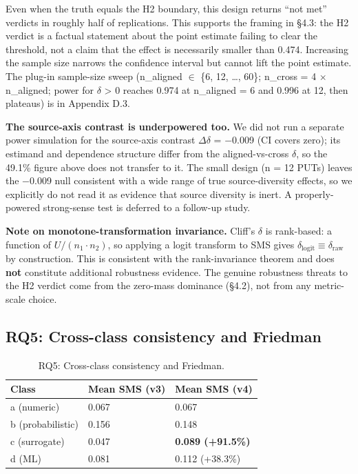 \documentclass[manuscript,screen,review]{acmart}
\begin{document}
Even when the truth equals the H2 boundary, this design returns ``not
met'' verdicts in roughly half of replications. This supports the
framing in §4.3: the H2 verdict is a factual statement about the point
estimate failing to clear the threshold, not a claim that the effect is
necessarily smaller than 0.474. Increasing the sample size narrows the
confidence interval but cannot lift the point estimate. The plug-in
sample-size sweep (n\_aligned $\in$ \{6, 12, \ldots, 60\}; n\_cross = 4 $\times$
n\_aligned; power for $\delta$ \textgreater{} 0 reaches 0.974 at n\_aligned = 6
and 0.996 at 12, then plateaus) is in Appendix D.3.

\textbf{The source-axis contrast is underpowered too.} We did not run a
separate power simulation for the source-axis contrast $\Delta\delta$ =
$-$0.009 (CI covers zero); its estimand and dependence structure differ
from the aligned-vs-cross $\delta$, so the 49.1\% figure above does not
transfer to it. The small design (n = 12 PUTs) leaves the $-$0.009 null
consistent with a wide range of true source-diversity effects, so we
explicitly do not read it as evidence that source diversity is inert. A
properly-powered strong-sense test is deferred to a follow-up study.

\textbf{Note on monotone-transformation invariance.} Cliff's $\delta$ is
rank-based: a function of $U / (n_1 \cdot n_2)$, so applying a logit transform to
SMS gives $\delta_{\mathrm{logit}} \equiv \delta_{\mathrm{raw}}$ by construction. This is consistent with the
rank-invariance theorem and does \textbf{not} constitute additional
robustness evidence. The genuine robustness threats to the H2 verdict
come from the zero-mass dominance (§4.2), not from any metric-scale
choice.

\subsection{RQ5: Cross-class consistency and Friedman}\label{rq3-cross-class-consistency-and-friedman}

{%
\begin{longtable}[]{@{}lll@{}}
\caption{RQ5: Cross-class consistency and Friedman.}\label{tab:p2-12}\\
\toprule\noalign{}
Class & Mean SMS (v3) & Mean SMS (v4) \\
\midrule\noalign{}
\endfirsthead
\endhead
\bottomrule\noalign{}
\endlastfoot
a (numeric) & 0.067 & 0.067 \\
b (probabilistic) & 0.156 & 0.148 \\
c (surrogate) & 0.047 & \textbf{0.089 (+91.5\%)} \\
d (ML) & 0.081 & 0.112 (+38.3\%) \\
\end{longtable}
}
\end{document}
